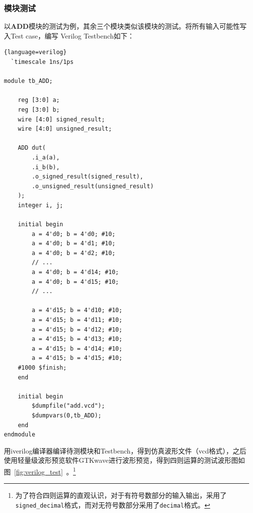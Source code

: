 \subsubsection{模块测试}
以\textbf{ADD}模块的测试为例，其余三个模块类似该模块的测试。将所有输入可能性写入Test case，编写 Verilog Testbench如下：
\begin{lstlisting}{language=verilog}
  `timescale 1ns/1ps

module tb_ADD;

    reg [3:0] a;
    reg [3:0] b;
    wire [4:0] signed_result;
    wire [4:0] unsigned_result;

    ADD dut(
        .i_a(a),
        .i_b(b),
        .o_signed_result(signed_result),
        .o_unsigned_result(unsigned_result)
    );
    integer i, j;

    initial begin
        a = 4'd0; b = 4'd0; #10;
        a = 4'd0; b = 4'd1; #10;
        a = 4'd0; b = 4'd2; #10;
        // ...
        a = 4'd0; b = 4'd14; #10;
        a = 4'd0; b = 4'd15; #10;
        // ...

        a = 4'd15; b = 4'd10; #10;
        a = 4'd15; b = 4'd11; #10;
        a = 4'd15; b = 4'd12; #10;
        a = 4'd15; b = 4'd13; #10;
        a = 4'd15; b = 4'd14; #10;
        a = 4'd15; b = 4'd15; #10;
    #1000 $finish;
    end

    initial begin
        $dumpfile("add.vcd");
        $dumpvars(0,tb_ADD);
    end
endmodule
\end{lstlisting}
用iverilog编译器编译待测模块和Testbench，得到仿真波形文件（vcd格式），之后使用轻量级波形预览软件GTKwave进行波形预览，得到四则运算的测试波形图如图~\ref{fig:verilog_test}~。\footnote{为了符合四则运算的直观认识，对于有符号数部分的输入输出，采用了\texttt{signed\_decimal}格式，而对无符号数部分采用了\texttt{decimal}格式。}
